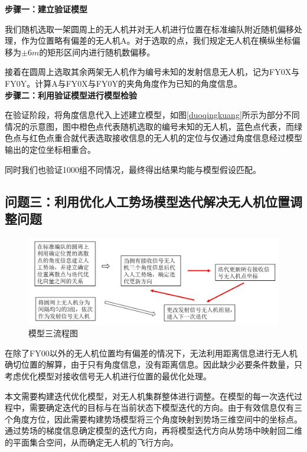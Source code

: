 \documentclass{my_paper}
\begin{document}
\textbf{步骤一：建立验证模型}

我们随机选取一架圆周上的无人机并对无人机进行位置在标准编队附近随机偏移处理，作为位置略有偏差的无人机A。对于选取的点，我们规定无人机在横纵坐标偏移为$\pm6m$的矩形区间内进行随机数偏移。

接着在圆周上选取其余两架无人机作为编号未知的发射信息无人机，记为FY0X与FY0Y。计算A与FY0X与FY0Y的夹角角度作为已知的角度信息。\\

\textbf{步骤二：利用验证模型进行模型检验}

在验证阶段，将角度信息代入上述建立模型，如图\ref{duoqingkuang}所示为部分不同情况的示意图，图中橙色点代表随机选取的编号未知的无人机，蓝色点代表，而绿色点与红色点重合就代表选取接收信息的无人机的定位与仅通过角度信息经过模型输出的定位坐标相重合。

同时我们也验证1000组不同情况，最终得出结果均能与模型假设匹配。



\subsection{问题三：利用优化人工势场模型迭代解决无人机位置调整问题}


\begin{figure}[h]
    \centering
    \includegraphics[width=1\textwidth]{images/wentisan.jpg}
    \caption{模型三流程图}
    \label{moxingsan}
\end{figure}

在除了FY00以外的无人机位置均有偏差的情况下，无法利用距离信息进行无人机确切位置的解算，由于只有角度信息，没有距离信息。因此缺少必要条件数量，只考虑优化模型对接收信号无人机进行位置的最优化处理。

本文需要构建迭代优化模型，对无人机集群整体进行调整。在模型的每一次迭代过程中，需要确定迭代的目标与在当前状态下模型迭代的方向。由于有效信息仅有三个角度方位，因此需要构建势场模型将三个角度映射到势场三维空间中的坐标点。通过势场的梯度信息确定模型的迭代方向，再将模型迭代方向从势场中映射回二维的平面集合空间，从而确定无人机的飞行方向。
\end{document}
